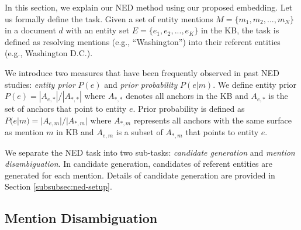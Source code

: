 \documentclass[11pt,letterpaper]{article}
\begin{document}
In this section, we explain our NED method using our proposed embedding.
Let us formally define the task.
Given a set of entity mentions $M = \{m_1, m_2, ..., m_N\}$ in a document $d$ with an entity set $E = \{e_1, e_2, ..., e_K\}$ in the KB, the task is defined as resolving mentions (e.g., ``Washington'') into their referent entities (e.g., \textsf{Washington D.C.}).

We introduce two measures that have been frequently observed in past NED studies: \textit{entity prior} $P(e)$ and \textit{prior probability} $P(e|m)$.
We define entity prior $P(e) = |A_{e,*}| / |A_{*,*}|$ where $A_{*,*}$ denotes all anchors in the KB and $A_{e,*}$ is the set of anchors that point to entity $e$.
Prior probability is defined as $P(e|m) = |A_{e,m}| / |A_{*,m}|$ where $A_{*,m}$ represents all anchors with the same surface as mention $m$ in KB and $A_{e, m}$ is a subset of $A_{*,m}$ that points to entity $e$.

We separate the NED task into two sub-tasks: \textit{candidate generation} and \textit{mention disambiguation}.
In candidate generation, candidates of referent entities are generated for each mention.
Details of candidate generation are provided in Section \ref{subsubsec:ned-setup}.



\subsection{Mention Disambiguation}
\end{document}
